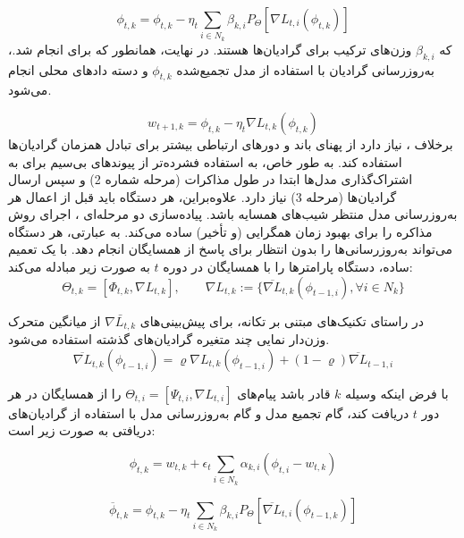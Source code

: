 \begin{equation}\label{e129}
	\phi_{t,k}=\phi_{t,k}-\eta_t \sum_{i\in N_k}\beta_{k,i}P_{\Theta}[\nabla L_{t,i}(\phi_{t,k})]
\end{equation}
که $\beta_{k,i}$ وزن‌های ترکیب برای گرادیان‌ها هستند. در نهایت، همانطور که برای  انجام شد.، به‌روزرسانی گرادیان با استفاده از مدل تجمیع‌شده $\phi_{t,k}$ و دسته دادهای محلی انجام می‌شود.

\begin{equation}\label{e130}
	w_{t+1,k}=\phi_{t,k}-\eta_t \nabla L_{t,k}(\phi_{t,k})
\end{equation}
برخلاف ،  نیاز دارد از پهنای باند و دورهای ارتباطی بیشتر برای تبادل همزمان گرادیان‌ها استفاده کند. به طور خاص، به استفاده فشرده‌تر از پیوندهای بی‌سیم  برای به اشتراک‌گذاری مدل‌ها ابتدا در طول مذاکرات (مرحله شماره 2) و سپس ارسال گرادیان‌ها (مرحله 3) نیاز دارد. علاوه‌براین، هر دستگاه باید قبل از اعمال هر به‌روزرسانی مدل منتظر شیب‌های همسایه باشد. پیاده‌سازی دو مرحله‌ای ، اجرای روش مذاکره را برای بهبود زمان همگرایی (و تأخیر) ساده می‌کند. به عبارتی، هر دستگاه می‌تواند به‌روزرسانی‌ها را بدون انتظار برای پاسخ از همسایگان انجام دهد. با یک تعمیم ساده، دستگاه  پارامترها را با همسایگان در دوره $t$ به صورت زیر مبادله می‌کند:
\begin{equation}\label{e130}
	\Theta_{t,k}=[\Phi_{t,k},\nabla L_{t,k}], \qquad  \nabla L_{t,k}:=\{\overline{\nabla L}_{t,k}(\phi_{t-1,i}),\forall i\in N_k\}	
\end{equation}

در راستای تکنیک‌های مبتنی بر تکانه، برای پیش‌بینی‌های $\bar{\nabla L_{t,k}}$ از میانگین متحرک وزن‌دار نمایی چند متغیره گرادیان‌های گذشته استفاده می‌شود.
\begin{equation}\label{e131}
	\overline{\nabla L}_{t,k}(\phi_{t-1,i})=\varrho \nabla L_{t,k}(\phi_{t-1,i})+(1-\varrho)\overline{\nabla L}_{t-1,i}
\end{equation}

با فرض اینکه وسیله $k$ قادر باشد پیام‌های $\Theta_{t,i}=[\Psi_{t,i},\nabla L_{t,i}]$  
را از همسایگان در هر دور $t$ دریافت کند، گام تجمیع مدل و گام به‌روزرسانی مدل با استفاده از گرادیان‌های دریافتی به صورت زیر است:

\begin{equation}\label{e132}
	\phi_{t,k}=w_{t,k}+\epsilon_t \sum_{i\in N_k}\alpha_{k,i}(\phi_{t,i}-w_{t,k})
\end{equation}

\begin{equation}\label{e133}
	\overline{\phi}_{t,k}=\phi_{t,k}-\eta_t \sum_{i\in N_k}\beta_{k,i}P_\Theta[\overline{\nabla L}_{t,i}(\phi_{t-1,k})]
\end{equation}


